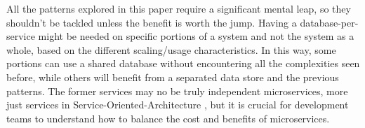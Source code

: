 \documentclass[conference]{IEEEtran}
\begin{document}
All the patterns explored in this paper require a significant mental leap, so they shouldn't be tackled unless the benefit is worth the jump. Having a database-per-service might be needed on specific portions of a system and not the system as a whole, based on the different scaling/usage characteristics. In this way, some portions can use a shared database without encountering all the complexities seen before, while others will benefit  from a separated data store and the previous patterns. The former services may no be truly independent microservices, more just services in Service-Oriented-Architecture \cite{soa}, but it is crucial for development teams to understand how to balance the cost and benefits of microservices. 







\end{document}
